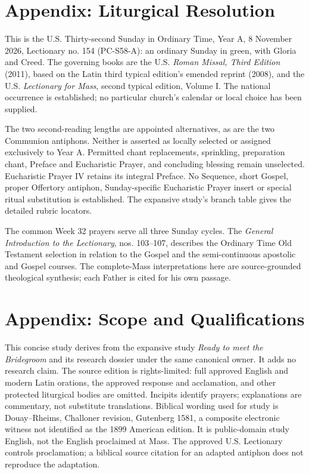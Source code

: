 \section{Appendix: Liturgical Resolution}
This is the U.S. Thirty-second Sunday in Ordinary Time, Year A, 8 November 2026, Lectionary no. 154 (PC-S58-A): an ordinary Sunday in green, with Gloria and Creed. The governing books are the U.S. \textit{Roman Missal, Third Edition} (2011), based on the Latin third typical edition's emended reprint (2008), and the U.S. \textit{Lectionary for Mass}, second typical edition, Volume I. The national occurrence is established; no particular church's calendar or local choice has been supplied.

The two second-reading lengths are appointed alternatives, as are the two Communion antiphons. Neither is asserted as locally selected or assigned exclusively to Year A. Permitted chant replacements, sprinkling, preparation chant, Preface and Eucharistic Prayer, and concluding blessing remain unselected. Eucharistic Prayer IV retains its integral Preface. No Sequence, short Gospel, proper Offertory antiphon, Sunday-specific Eucharistic Prayer insert or special ritual substitution is established. The expansive study's branch table gives the detailed rubric locators.

The common Week 32 prayers serve all three Sunday cycles. The \textit{General Introduction to the Lectionary}, nos. 103--107, describes the Ordinary Time Old Testament selection in relation to the Gospel and the semi-continuous apostolic and Gospel courses. The complete-Mass interpretations here are source-grounded theological synthesis; each Father is cited for his own passage.

\section{Appendix: Scope and Qualifications}
This concise study derives from the expansive study \textit{Ready to meet the Bridegroom} and its research dossier under the same canonical owner. It adds no research claim. The source edition is rights-limited: full approved English and modern Latin orations, the approved response and acclamation, and other protected liturgical bodies are omitted. Incipits identify prayers; explanations are commentary, not substitute translations. Biblical wording used for study is Douay--Rheims, Challoner revision, Gutenberg 1581, a composite electronic witness not identified as the 1899 American edition. It is public-domain study English, not the English proclaimed at Mass. The approved U.S. Lectionary controls proclamation; a biblical source citation for an adapted antiphon does not reproduce the adaptation.

